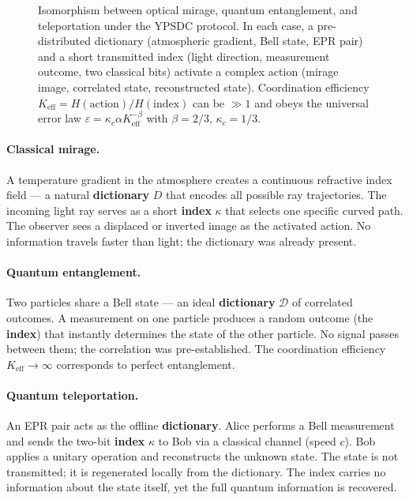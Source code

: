 \documentclass[12pt,a4paper]{article}
\theoremstyle{remark}
\begin{document}
\begin{figure}[htbp]
{%
		}
		\caption{Isomorphism between optical mirage, quantum entanglement, and teleportation under the YPSDC protocol. In each case, a pre-distributed dictionary (atmospheric gradient, Bell state, EPR pair) and a short transmitted index (light direction, measurement outcome, two classical bits) activate a complex action (mirage image, correlated state, reconstructed state). Coordination efficiency $K_{\mathrm{eff}} = H(\text{action})/H(\text{index})$ can be $\gg 1$ and obeys the universal error law $\varepsilon = \kappa_c \alpha K_{\mathrm{eff}}^{-\beta}$ with $\beta=2/3$, $\kappa_c=1/3$.}
		\label{fig:mirage-ypsdc}
	\end{figure}
	
	\paragraph{Classical mirage.}
	A temperature gradient in the atmosphere creates a continuous refractive index field --- a natural \textbf{dictionary} $D$ that encodes all possible ray trajectories. The incoming light ray serves as a short \textbf{index} $\kappa$ that selects one specific curved path. The observer sees a displaced or inverted image as the activated action. No information travels faster than light; the dictionary was already present.
	
	\paragraph{Quantum entanglement.}
	Two particles share a Bell state --- an ideal \textbf{dictionary} $\mathcal{D}$ of correlated outcomes. A measurement on one particle produces a random outcome (the \textbf{index}) that instantly determines the state of the other particle. No signal passes between them; the correlation was pre-established. The coordination efficiency $K_{\mathrm{eff}} \to \infty$ corresponds to perfect entanglement.
	
	\paragraph{Quantum teleportation.}
	An EPR pair acts as the offline \textbf{dictionary}. Alice performs a Bell measurement and sends the two-bit \textbf{index} $\kappa$ to Bob via a classical channel (speed $c$). Bob applies a unitary operation and reconstructs the unknown state. The state is not transmitted; it is regenerated locally from the dictionary. The index carries no information about the state itself, yet the full quantum information is recovered.
	
\end{document}
